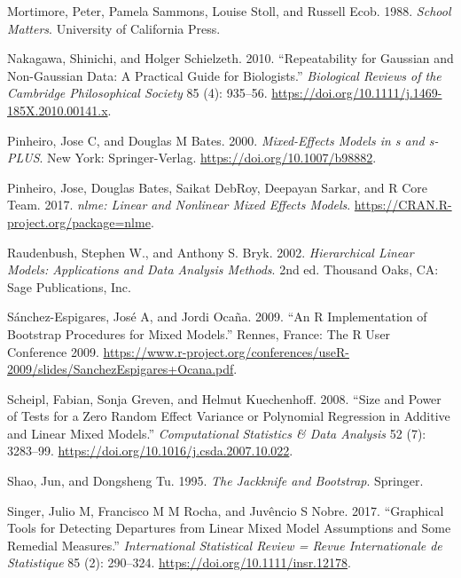 \begin{CSLReferences}{1}{0}
\leavevmode{}%
Mortimore, Peter, Pamela Sammons, Louise Stoll, and Russell Ecob. 1988. \emph{School Matters}. University of California Press.

\leavevmode{}%
Nakagawa, Shinichi, and Holger Schielzeth. 2010. {``Repeatability for Gaussian and Non-Gaussian Data: A Practical Guide for Biologists.''} \emph{Biological Reviews of the Cambridge Philosophical Society} 85 (4): 935--56. \url{https://doi.org/10.1111/j.1469-185X.2010.00141.x}.

\leavevmode{}%
Pinheiro, Jose C, and Douglas M Bates. 2000. \emph{Mixed-Effects Models in s and s-PLUS}. New York: Springer-Verlag. \url{https://doi.org/10.1007/b98882}.

\leavevmode{}%
Pinheiro, Jose, Douglas Bates, Saikat DebRoy, Deepayan Sarkar, and R Core Team. 2017. \emph{{nlme}: Linear and Nonlinear Mixed Effects Models}. \url{https://CRAN.R-project.org/package=nlme}.

\leavevmode{}%
Raudenbush, Stephen W., and Anthony S. Bryk. 2002. \emph{Hierarchical Linear Models: Applications and Data Analysis Methods}. 2nd ed. Thousand Oaks, CA: Sage Publications, Inc.

\leavevmode{}%
Sánchez-Espigares, José A, and Jordi Ocaña. 2009. {``An {R} Implementation of Bootstrap Procedures for Mixed Models.''} Rennes, France: The R User Conference 2009. \url{https://www.r-project.org/conferences/useR-2009/slides/SanchezEspigares+Ocana.pdf}.

\leavevmode{}%
Scheipl, Fabian, Sonja Greven, and Helmut Kuechenhoff. 2008. {``Size and Power of Tests for a Zero Random Effect Variance or Polynomial Regression in Additive and Linear Mixed Models.''} \emph{Computational Statistics \& Data Analysis} 52 (7): 3283--99. \url{https://doi.org/10.1016/j.csda.2007.10.022}.

\leavevmode{}%
Shao, Jun, and Dongsheng Tu. 1995. \emph{The Jackknife and Bootstrap}. Springer.

\leavevmode{}%
Singer, Julio M, Francisco M M Rocha, and Juvêncio S Nobre. 2017. {``Graphical Tools for Detecting Departures from Linear Mixed Model Assumptions and Some Remedial Measures.''} \emph{International Statistical Review = Revue Internationale de Statistique} 85 (2): 290--324. \url{https://doi.org/10.1111/insr.12178}.


\end{CSLReferences}
